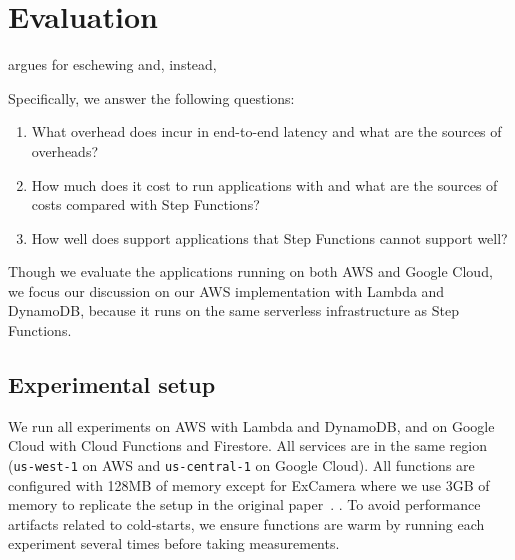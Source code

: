\section{Evaluation}\label{sec:eval}

\name{} argues for eschewing  and,
instead, 


Specifically, we answer the following questions:

\begin{enumerate}

  \item What overhead does \name{} incur in end-to-end latency and what are
   the sources of  overheads?

  \item How much does it cost to run applications with \name{} and what are
   the sources of costs compared with Step Functions?

  \item How well does \name{} support applications that Step Functions cannot
   support well?

\end{enumerate}

Though we evaluate the applications running on both AWS and Google Cloud, we
focus our discussion on our AWS implementation with Lambda and DynamoDB,
because it runs on the same serverless infrastructure as Step Functions.

\subsection{Experimental setup}

We run all experiments on AWS with Lambda and DynamoDB, and on Google Cloud
with Cloud Functions and Firestore. All services are in the same region
(\texttt{us-west-1} on AWS and \texttt{us-central-1} on Google Cloud). All
functions are configured with 128MB of memory except for ExCamera where we use
3GB of memory to replicate the setup in the original paper~\cite {excamera,
gg-atc}. . To avoid performance
artifacts related to cold-starts, we ensure functions are warm by running each
experiment several times before taking measurements.

